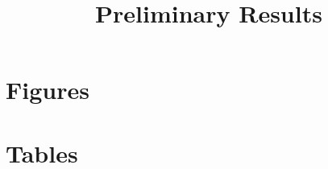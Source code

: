 \documentclass[12pt,a4paper]{article}
\title{Preliminary Results}
\author{}
\date{}
\begin{document}
\maketitle




\newpage
\section{Figures}

\begin{figure}[h]
\caption{}
\centering
\end{figure}



\newpage
\section{Tables}

\begin{table}[h]
\caption{}
\centering
%
\end{table}
\end{document}
